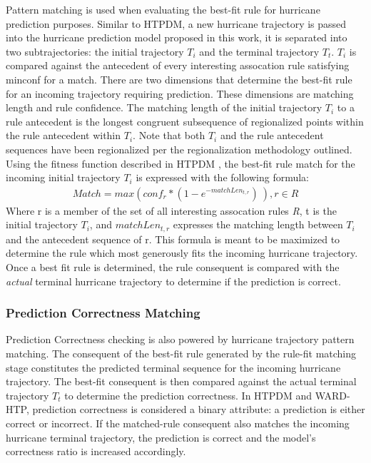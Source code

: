 \documentclass[12pt,conference]{IEEEtran}
\begin{document}
Pattern matching is used when evaluating the best-fit rule for hurricane prediction purposes. Similar to HTPDM, a new hurricane trajectory is passed into the hurricane prediction model proposed in this work, it is separated into two subtrajectories: the initial trajectory $T_{i}$ and the terminal trajectory $T_{t}$. $T_{i}$ is compared against the antecedent of every interesting assocation rule satisfying minconf for a match. There are two dimensions that determine the best-fit rule for an incoming trajectory requiring prediction. These dimensions are matching length and rule confidence. The matching length of the initial trajectory $T_{i}$ to a rule antecedent is the longest congruent subsequence of regionalized points within the rule antecedent within $T_{i}$. Note that both $T_{i}$ and the rule antecedent sequences have been regionalized per the regionalization methodology outlined. Using the fitness function described in HTPDM \cite{major-hurricane-model}, the best-fit rule match for the incoming initial trajectory $T_{i}$ is expressed with the following formula:
\begin{eqnarray*}
Match = max( conf_{r} * (1 - e^{-matchLen_{t,r} } )\ ), r \in R
\end{eqnarray*}
Where r is a member of the set of all interesting assocation rules \textit{R}, t is the initial trajectory $T_{i}$, and $matchLen_{t,r}$ expresses the matching length between $T_{i}$ and the antecedent sequence of r. This formula is meant to be maximized to determine the rule which most generously fits the incoming hurricane trajectory. Once a best fit rule is determined, the rule consequent is compared with the \textit{actual} terminal hurricane trajectory to determine if the prediction is correct.

\subsubsection{Prediction Correctness Matching}

Prediction Correctness checking is also powered by hurricane trajectory pattern matching. The consequent of the best-fit rule generated by the rule-fit matching stage constitutes the predicted terminal sequence for the incoming hurricane trajectory. The best-fit consequent is then compared against the actual terminal trajectory $T_{t}$ to determine the prediction correctness. In HTPDM and WARD-HTP, prediction correctness is considered a binary attribute: a prediction is either correct or incorrect. If the matched-rule consequent also matches the incoming hurricane terminal trajectory, the prediction is correct and the model's correctness ratio is increased accordingly.
\end{document}
